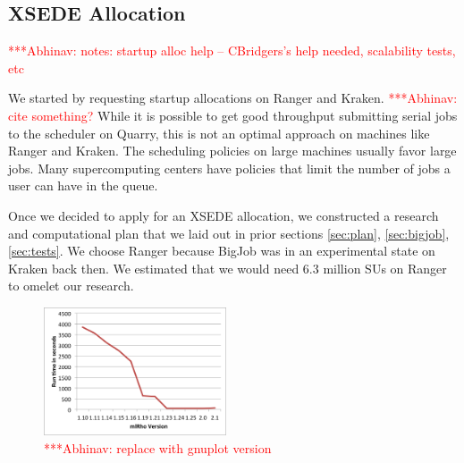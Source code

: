 \documentclass{sig-alternate}
\newcommand{\abhi}[1]{ {\textcolor{red} { ***Abhinav: #1 }}}
\newcommand{\abhi}[1]{ {}}
\begin{document}
%

\subsection{XSEDE Allocation}
\abhi{notes: startup alloc help -- CBridgers's help needed, scalability tests, etc}

We started by requesting startup allocations on Ranger and Kraken.  \abhi{cite something?} While it is possible to get good throughput submitting serial jobs to the scheduler on Quarry, this is not an optimal approach on machines like Ranger and Kraken. The scheduling policies on large machines usually favor large jobs. Many supercomputing centers have policies that limit the number of jobs a user can have in the queue. 

Once we decided to apply for an XSEDE allocation, we constructed a research and computational plan that we laid out in prior sections \ref{sec:plan}, \ref{sec:bigjob}, \ref{sec:tests}. We choose Ranger because BigJob was in an experimental state on Kraken back then. We estimated that we would need 6.3 million SUs on Ranger to omelet our research. 


\begin{figure} %
\centering
\includegraphics[width=0.48\textwidth]{figures/mlrho-benchmarks.png}
\caption{\abhi{replace with gnuplot version}}
\label{fig:stampede-bench}
\end{figure}
\end{document}
